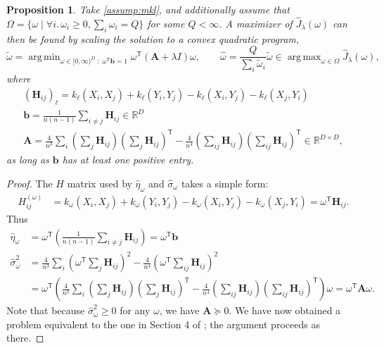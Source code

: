 \documentclass{article}
\newtheorem{prop}[theorem]{Proposition}  \crefname{prop}{Proposition}{Propositions}
\newcommand{\R}{\mathbb{R}} \renewcommand{\H}{\mathcal{H}} \newcommand{\N}{\mathcal{N}} \newcommand{\X}{\mathcal{X}} \renewcommand{\P}{\mathbb{P}} \newcommand{\Q}{\mathbb{Q}} \DeclareMathOperator{\E}{\mathbb{E}} \DeclareMathOperator{\Var}{Var}
\newcommand{\tp}{^\mathsf{T}}
\DeclareMathOperator*{\argmax}{arg\,max}
\DeclareMathOperator*{\argmin}{arg\,min}
\begin{document}
\begin{prop} \label{prop:mkl-soln}
    Take \cref{assump:mkl},
    and additionally assume that $\Omega = \{ \omega \mid \forall i.\, \omega_i \ge 0, \sum_i \omega_i = Q\}$ for some $Q < \infty$.
    A maximizer of $\hat J_\lambda(\omega)$ can then be found
    by scaling the solution to a convex quadratic program,
    \[
        \tilde\omega =
        \argmin_{\omega \in [0, \infty)^D \; : \; \omega\tp \mathbf b = 1}
            \omega\tp (\mathbf A + \lambda I) \omega
        ,\qquad
        \hat\omega = \frac{Q}{\sum_i \tilde\omega_i} \tilde\omega \in \argmax_{\omega \in \Omega} \hat J_\lambda(\omega)
    ,\]
    where
    \begin{gather*}
        \left( \mathbf H_{ij} \right)_\ell
      = k_\ell(X_i, X_j) + k_\ell(Y_i, Y_j) - k_\ell(X_i, Y_j) - k_\ell(X_j, Y_i)
    \\
        \mathbf b
      = \frac{1}{n (n-1)} \sum_{i \ne j} \mathbf H_{ij} 
      \in \R^D
    \\
        \mathbf A
      = \frac{4}{n^3} \sum_i \left( \sum_j \mathbf H_{ij} \right) \left( \sum_j \mathbf H_{ij} \right)\tp
      - \frac{4}{n^4} \left(\sum_{ij} \mathbf H_{ij} \right) \left(\sum_{ij} \mathbf H_{ij} \right)\tp
      \in \R^{D \times D}
    ,\end{gather*}
    as long as $\mathbf b$ has at least one positive entry.
\end{prop}
\begin{proof}
The $H$ matrix used by $\hat\eta_\omega$ and $\hat\sigma_\omega$ takes a simple form:
\begin{align*}
     H_{ij}^{(\omega)}
  &= k_\omega(X_i, X_j) + k_\omega(Y_i, Y_j) - k_\omega(X_i, Y_j) - k_\omega(X_j, Y_i)
= \omega\tp \mathbf H_{ij}
.\end{align*}
Thus
\begin{align*}
     \hat\eta_{\omega}
  &= \omega\tp \left(\frac{1}{n (n-1)} \sum_{i \ne j} \mathbf H_{ij} \right)
   = \omega\tp \mathbf b
\\   \hat\sigma_\omega^2
&= \frac{4}{n^3} \sum_i \left( \omega\tp \sum_j \mathbf H_{ij} \right)^2
   - \frac{4}{n^4} \left( \omega\tp \sum_{ij} \mathbf H_{ij} \right)^2
\\&= \omega\tp \left(
        \frac{4}{n^3} \sum_i \left( \sum_j \mathbf H_{ij} \right) \left( \sum_j \mathbf H_{ij} \right)\tp
      - \frac{4}{n^4} \left(\sum_{ij} \mathbf H_{ij} \right) \left(\sum_{ij} \mathbf H_{ij} \right)\tp
      \right) \omega
   = \omega\tp \mathbf A \omega
.\end{align*}
Note that because $\hat\sigma_\omega^2 \ge 0$ for any $\omega$,
we have $\mathbf A \succeq 0$.
We have now obtained a problem equivalent to the one in Section 4 of \citet{Gretton2012NeurIPS};
the argument proceeds as there.
\end{proof}
\end{document}
